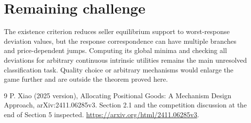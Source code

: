 \documentclass[11pt]{article}
\begin{document}
\section*{Remaining challenge}
The existence criterion reduces seller equilibrium support to worst-response deviation values, but the response correspondence can have multiple branches and price-dependent jumps. Computing its global minima and checking all deviations for arbitrary continuous intrinsic utilities remains the main unresolved classification task. Quality choice or arbitrary mechanisms would enlarge the game further and are outside the theorem proved here.
\begin{thebibliography}{9}
 P. Xiao (2025 version), Allocating Positional Goods: A Mechanism Design Approach, arXiv:2411.06285v3. Section 2.1 and the competition discussion at the end of Section 5 inspected. \url{https://arxiv.org/html/2411.06285v3}.
\end{thebibliography}
\end{document}
